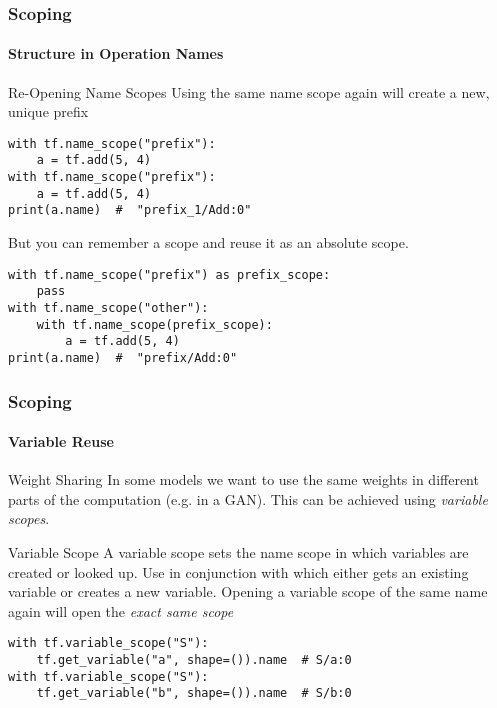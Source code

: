 \begin{frame}[fragile]
    \frametitle{Scoping}
    \framesubtitle{Structure in Operation Names}
    \begin{block}{Re-Opening Name Scopes}
        Using the same name scope again will create a new, unique prefix 
        \begin{lstlisting}
with tf.name_scope("prefix"):
    a = tf.add(5, 4)
with tf.name_scope("prefix"):
    a = tf.add(5, 4)
print(a.name)  #  "prefix_1/Add:0"
        \end{lstlisting}
        But you can remember a scope and reuse it as an absolute scope.
        \begin{lstlisting}
with tf.name_scope("prefix") as prefix_scope:
    pass
with tf.name_scope("other"):
    with tf.name_scope(prefix_scope):
        a = tf.add(5, 4)
print(a.name)  #  "prefix/Add:0"
        \end{lstlisting}
    \end{block}
\end{frame}

\begin{frame}[fragile]
    \frametitle{Scoping}
    \framesubtitle{Variable Reuse}
    \begin{block}{Weight Sharing}
        In some models we want to use the same weights in different parts of the computation (e.g. in a GAN).
        This can be achieved using \emph{variable scopes}.
    \end{block}
    \begin{block}{Variable Scope}
        A variable scope sets the name scope in which variables are created or looked up. Use in conjunction with
         which either gets an existing variable or creates a new variable. Opening a variable 
        scope of the same name again will open the \emph{exact same scope}
\begin{lstlisting}
with tf.variable_scope("S"):
    tf.get_variable("a", shape=()).name  # S/a:0
with tf.variable_scope("S"):
    tf.get_variable("b", shape=()).name  # S/b:0
        \end{lstlisting}
    \end{block}
\end{frame}

